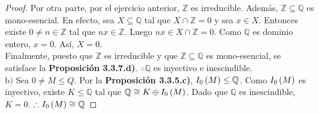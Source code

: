 \documentclass{article}
\begin{document}
\begin{enumerate}[label=\textbf{Ej \arabic*.}]
\begin{proof}
			Por otra parte, por el ejercicio anterior, $\mathbb{Z}$ es irreducible. Además, $\mathbb{Z}\subseteq\mathbb{Q}$ es mono-esencial. En efecto, sea $X\subseteq\mathbb{Q}$ tal que $X\cap\mathbb{Z}=0$ y sea $x \in X$. Entonces existe $0 \neq n\in\mathbb{Z}$ tal que $nx\in\mathbb{Z}$. Luego $nx \in X\cap\mathbb{Z}=0$. Como $\mathbb{Q}$ es dominio entero, $x=0$. Así, $X=0$.\\
			
			Finalmente, puesto que $\mathbb{Z}$ es irreducible y que $\mathbb{Z}\subseteq\mathbb{Q}$ es mono-esencial, se satisface la \textbf{Proposición 3.3.7.d)}. $\therefore\mathbb{Q}$ es inyectivo e inescindible.\\
			
			$\boxed{\text{b)}}$ Sea $0 \neq M \leq Q$. Por la \textbf{Proposición 3.3.5.c)}, $I_{0}\left(M\right)\leq\mathbb{Q}$. Como $I_{0}\left(M\right)$ es inyectivo, existe $K\leq\mathbb{Q}$ tal que $\mathbb{Q} \cong K \oplus I_{0}\left(M\right)$. Dado que $\mathbb{Q}$ es inescindible, $K=0$. $\therefore I_{0}\left(M\right)\cong\mathbb{Q}$
		\end{proof}
		

\end{enumerate}
\end{document}

